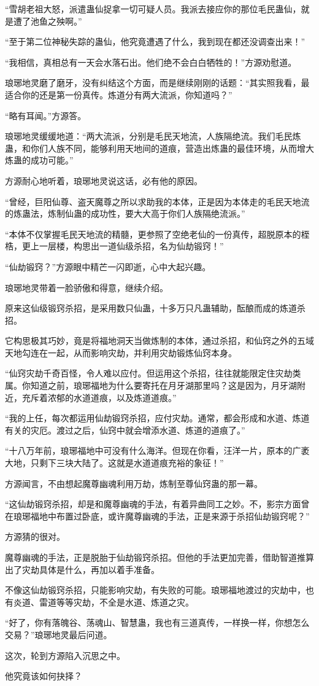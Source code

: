 \begin{this_body}
“雪胡老祖大怒，派遣蛊仙捉拿一切可疑人员。我派去接应你的那位毛民蛊仙，就是遭了池鱼之殃啊。”

“至于第二位神秘失踪的蛊仙，他究竟遭遇了什么，我到现在都还没调查出来！”

“我相信，真相总有一天会水落石出。他们绝不会白白牺牲的！”方源劝慰道。

琅琊地灵磨了磨牙，没有纠结这个方面，而是继续刚刚的话题：“其实照我看，最适合你的还是第一份真传。炼道分有两大流派，你知道吗？”

“略有耳闻。”方源答。

琅琊地灵缓缓地道：“两大流派，分别是毛民天地流，人族隔绝流。我们毛民炼蛊，和你们人族不同，能够利用天地间的道痕，营造出炼蛊的最佳环境，从而增大炼蛊的成功可能。”

方源耐心地听着，琅琊地灵说这话，必有他的原因。

“曾经，巨阳仙尊、盗天魔尊之所以求助我的本体，正是因为本体走的毛民天地流的炼蛊法，炼制仙蛊的成功性，要大大高于你们人族隔绝流派。”

“本体不仅掌握毛民天地流的精髓，更参照了空绝老仙的一份真传，超脱原本的桎梏，更上一层楼，构思出一道仙级杀招，名为仙劫锻窍！”

“仙劫锻窍？”方源眼中精芒一闪即逝，心中大起兴趣。

琅琊地灵带着一脸骄傲和得意，继续介绍。

原来这仙级锻窍杀招，是采用数只仙蛊，十多万只凡蛊辅助，酝酿而成的炼道杀招。

它构思极其巧妙，竟是将福地洞天当做炼制的本体，通过杀招，和仙窍之外的五域天地勾连在一起，从而影响灾劫，并利用灾劫锻炼仙窍本身。

“仙窍灾劫千奇百怪，令人难以应付。但运用这个杀招，往往就能限定住灾劫类属。你知道之前，琅琊福地为什么要寄托在月牙湖那里吗？这是因为，月牙湖附近，充斥着浓郁的水道道痕，以及炼道道痕。”

“我的上任，每次都运用仙劫锻窍杀招，应付灾劫。通常，都会形成和水道、炼道有关的灾厄。渡过之后，仙窍中就会增添水道、炼道的道痕了。”

“十八万年前，琅琊福地中可没有什么海洋。但现在你看，汪洋一片，原本的广袤大地，只剩下三块大陆了。这就是水道道痕充裕的象征！”

方源闻言，不由想起魔尊幽魂利用万劫，炼制至尊仙窍蛊的那一幕。

“这仙劫锻窍杀招，却是和魔尊幽魂的手法，有着异曲同工之妙。不，影宗方面曾在琅琊福地中布置过卧底，或许魔尊幽魂的手法，正是来源于杀招仙劫锻窍呢？”

方源猜的很对。

魔尊幽魂的手法，正是脱胎于仙劫锻窍杀招。但他的手法更加完善，借助智道推算出了灾劫具体是什么，再加以着手准备。

不像这仙劫锻窍杀招，只能影响灾劫，有失败的可能。琅琊福地渡过的灾劫中，也有炎道、雷道等等灾劫，不全是水道、炼道之灾。

“好了，你有落魄谷、荡魂山、智慧蛊，我也有三道真传，一样换一样，你想怎么交易？”琅琊地灵最后问道。

这次，轮到方源陷入沉思之中。

他究竟该如何抉择？

\end{this_body}

